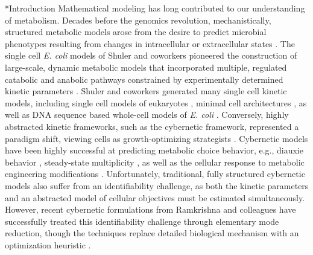 \documentclass[12pt]{article}
\makeatletter
\renewcommand\section{\@startsection
	{subsection}{2}{0mm}
	{-0.2in}
	{0.05\baselineskip}
	{\normalfont\large\bfseries}}
\makeatother
\begin{document}
\setcounter{page}{1}

\linenumbers

\section*{Introduction}
Mathematical modeling has long contributed to our understanding of metabolism. 
Decades before the genomics revolution, mechanistically, structured metabolic models arose from the desire to predict microbial phenotypes resulting from changes in intracellular or extracellular states \citep{1976_fredrickson_BiotechBioeng}. 
The single cell \textit{E. coli} models of Shuler and coworkers pioneered the construction of large-scale, dynamic metabolic models that incorporated multiple, regulated catabolic and anabolic pathways constrained by experimentally determined kinetic parameters \citep{1984_domach_shuler_BiotechBioeng_01}. 
Shuler and coworkers generated many single cell kinetic models, including single cell models of eukaryotes \citep{1989_steinmeyer_shuler_ChemEngSci,1992_wu_shuler_AnnNYAcadSci}, minimal cell architectures \citep{2004_castellanos_shuler_PNAS}, as well as DNA sequence based whole-cell models of \textit{E. coli} \citep{2008_atlas_shuler_IETSysBio}.
Conversely, highly abstracted kinetic frameworks, such as the cybernetic framework, represented a paradigm shift, viewing cells as growth-optimizing strategists \citep{1985_dhurjati_ramkrishna_tsao_BiotechBioeng}. 
Cybernetic models have been highly successful at predicting metabolic choice behavior, e.g., diauxie behavior \citep{1986_kompala_ramkrishna_tsao_BiotechBioeng}, steady-state multiplicity \citep{2012_kim_ramkrishna_BiotechProg}, as well as the cellular response to metabolic engineering modifications \citep{1999_varner_ramkrishna_MetaEng}. 
Unfortunately, traditional, fully structured cybernetic models also suffer from an identifiability challenge, as both the kinetic parameters and an abstracted model of cellular objectives must be estimated simultaneously. 
However, recent cybernetic formulations from Ramkrishna and colleagues have successfully treated this identifiability challenge through elementary mode reduction, though the techniques replace detailed biological mechanism with an optimization heuristic \cite{2009_song_ramkrishna_BiotechBioeng,Song:2011aa}. 
\end{document}
